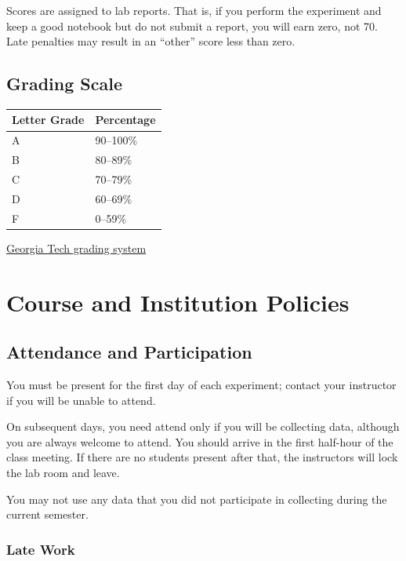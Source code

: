 \documentclass[11pt]{article}
\begin{document}
Scores are assigned to lab reports. That is, if you perform the experiment and keep a good notebook but do not submit a report, you will earn zero, not 70. Late penalties may result in an ``other'' score less than zero.

\subsection*{Grading Scale}

\begin{center}
\renewcommand{\arraystretch}{1.15}
\begin{tabularx}{0.98\textwidth}{X p{}}
\toprule
\textbf{Letter Grade} & \textbf{Percentage} \\
\midrule
A & 90--100\% \\
B & 80--89\% \\
C & 70--79\% \\
D & 60--69\% \\
F & 0--59\% \\
\bottomrule
\end{tabularx}
\renewcommand{\arraystretch}{1.0}
\end{center}

\href{http://registrar.gatech.edu/info/grading-system}{Georgia Tech grading system}

\section*{Course and Institution Policies}

\subsection*{Attendance and Participation}

You must be present for the first day of each experiment; contact your instructor if you will be unable to attend.

On subsequent days, you need attend only if you will be collecting data, although you are always welcome to attend. You should arrive in the first half-hour of the class meeting. If there are no students present after that, the instructors will lock the lab room and leave.

You may not use any data that you did not participate in collecting during the current semester.

\subsubsection*{Late Work}
\end{document}
